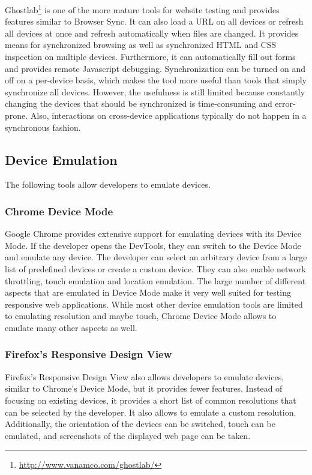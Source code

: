 Ghostlab\footnote{\url{http://www.vanamco.com/ghostlab/}} is one of the more mature tools for website testing and provides features similar to Browser Sync. It can also load a URL on all devices or refresh all devices at once and refresh automatically when files are changed. It provides means for synchronized browsing as well as synchronized HTML and CSS inspection on multiple devices. Furthermore, it can automatically fill out forms and provides remote Javascript debugging. Synchronization can be turned on and off on a per-device basis, which makes the tool more useful than tools that simply synchronize all devices. However, the usefulness is still limited because constantly changing the devices that should be synchronized is time-consuming and error-prone. Also, interactions on cross-device applications typically do not happen in a synchronous fashion.

\subsection{Device Emulation}

The following tools allow developers to emulate devices. 

\subsubsection{Chrome Device Mode}

Google Chrome provides extensive support for emulating devices with its Device Mode. If the developer opens the DevTools, they can switch to the Device Mode and emulate any device. The developer can select an arbitrary device from a large list of predefined devices or create a custom device. They can also enable network throttling, touch emulation and location emulation. The large number of different aspects that are emulated in Device Mode make it very well suited for testing responsive web applications. While most other device emulation tools are limited to emulating resolution and maybe touch, Chrome Device Mode allows to emulate many other aspects as well.

\subsubsection{Firefox's Responsive Design View}

Firefox's Responsive Design View also allows developers to emulate devices, similar to Chrome's Device Mode, but it provides fewer features. Instead of focusing on existing devices, it provides a short list of common resolutions that can be selected by the developer. It also allows to emulate a custom resolution. Additionally, the orientation of the devices can be switched, touch can be emulated, and screenshots of the displayed web page can be taken.

